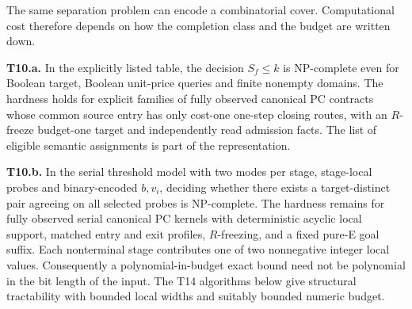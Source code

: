 The same separation problem can encode a combinatorial cover. Computational cost therefore depends on how the completion class and the budget are written down.

\begin{theorem}\label{thm:t10}

\label{thm:t10a}

\textbf{T10.a.} In the explicitly listed table, the decision \(S_f\le k\) is NP-complete even for Boolean target, Boolean unit-price queries and finite nonempty domains. The hardness holds for explicit families of fully observed canonical PC contracts whose common source entry has only cost-one one-step closing routes, with an \(R\)-freeze budget-one target and independently read admission facts. The list of eligible semantic assignments is part of the representation.

\label{thm:t10b}

\textbf{T10.b.} In the serial threshold model with two modes per stage, stage-local probes and binary-encoded \(b,v_i\), deciding whether there exists a target-distinct pair agreeing on all selected probes is NP-complete. The hardness remains for fully observed serial canonical PC kernels with deterministic acyclic local support, matched entry and exit profiles, \(R\)-freezing, and a fixed pure-E goal suffix. Each nonterminal stage contributes one of two nonnegative integer local values. Consequently a polynomial-in-budget exact bound need not be polynomial in the bit length of the input. The T14 algorithms below give structural tractability with bounded local widths and suitably bounded numeric budget.

\end{theorem}

